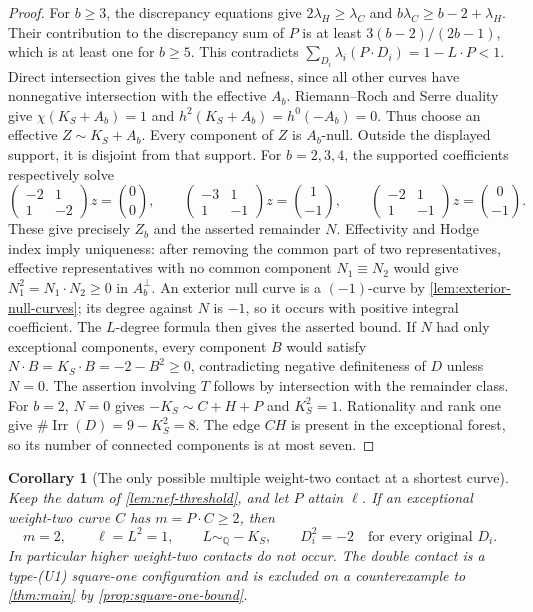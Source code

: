 \documentclass[11pt,reqno]{amsart}
\newtheorem{corollary}[corollary]{Corollary}
\theoremstyle{definition}
\theoremstyle{remark}
\DeclareMathOperator{\Irr}{Irr}
\newcommand{\QQ}{\mathbb Q}
\numberwithin{equation}{section}
\begin{document}
\begin{proof}
For $b\ge3$, the discrepancy equations give
$2\lambda_H\ge\lambda_C$ and
$b\lambda_C\ge b-2+\lambda_H$.
Their contribution to the discrepancy sum of $P$ is at least
$3(b-2)/(2b-1)$, which is at least one for $b\ge5$.
This contradicts $\sum_{D_i}\lambda_i(P\cdot D_i)=1-L\cdot P<1$.
Direct intersection gives the table and nefness, since all other
curves have nonnegative intersection with the effective $A_b$.
Riemann--Roch and Serre duality give
$\chi(K_S+A_b)=1$ and $h^2(K_S+A_b)=h^0(-A_b)=0$.
Thus choose an effective $Z\sim K_S+A_b$.
Every component of $Z$ is $A_b$-null. Outside the displayed support,
it is disjoint from that support.
For $b=2,3,4$, the supported coefficients respectively solve
\[
 \begin{pmatrix}-2&1\\1&-2\end{pmatrix}z=\binom00,
 \qquad
 \begin{pmatrix}-3&1\\1&-1\end{pmatrix}z=\binom1{-1},
 \qquad
 \begin{pmatrix}-2&1\\1&-1\end{pmatrix}z=\binom0{-1}.
\]
These give precisely $Z_b$ and the asserted remainder $N$.
Effectivity and Hodge index imply uniqueness: after removing the
common part of two representatives, effective representatives with no common component
$N_1\equiv N_2$ would give $N_1^2=N_1\cdot N_2\ge0$ in $A_b^\perp$.
An exterior null curve is a $(-1)$-curve by
\cref{lem:exterior-null-curves}; its degree against $N$ is $-1$, so it
occurs with positive integral coefficient. The $L$-degree formula
then gives the asserted bound.
If $N$ had only exceptional components, every component $B$ would satisfy
$N\cdot B=K_S\cdot B=-2-B^2\ge0$, contradicting negative definiteness
of $D$ unless $N=0$. The assertion involving $T$ follows by
intersection with the remainder class.
For $b=2$, $N=0$ gives $-K_S\sim C+H+P$ and $K_S^2=1$.
Rationality and rank one give $\#\Irr(D)=9-K_S^2=8$.
The edge $CH$ is present in the exceptional forest, so its number of
connected components is at most seven.
\end{proof}

\begin{corollary}[The only possible multiple weight-two contact at a shortest curve]
\label{cor:multiple-contact}
Keep the datum of \cref{lem:nef-threshold}, and let $P$ attain
$\ell$. If an exceptional weight-two curve $C$ has $m=P\cdot C\ge2$, then
\[
 m=2,\qquad \ell=L^2=1,\qquad L\sim_{\QQ}-K_S,
 \qquad D_i^2=-2\quad\text{for every original }D_i.
\]
In particular higher weight-two contacts do not occur. The double
contact is a type-\textup{(U1)} square-one configuration and is excluded on a
counterexample to \cref{thm:main} by \cref{prop:square-one-bound}.
\end{corollary}
\end{document}
